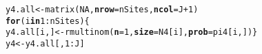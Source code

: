\documentclass[color=usenames,dvipsnames]{beamer}\usepackage[]{graphicx}\usepackage[]{color}
\makeatletter
\newcommand{\hlnum}[1]{\textcolor[rgb]{0.69,0.494,0}{#1}}%
\newcommand{\hlopt}[1]{\textcolor[rgb]{0,0,0}{#1}}%
\newcommand{\hlstd}[1]{\textcolor[rgb]{0,0,0}{#1}}%
\newcommand{\hlkwa}[1]{\textcolor[rgb]{0,0,0}{\textbf{#1}}}%
\newcommand{\hlkwb}[1]{\textcolor[rgb]{0,0.341,0.682}{#1}}%
\newcommand{\hlkwc}[1]{\textcolor[rgb]{0,0,0}{\textbf{#1}}}%
\newcommand{\hlkwd}[1]{\textcolor[rgb]{0.004,0.004,0.506}{#1}}%
\newenvironment{kframe}{%
 \def\at@end@of@kframe{}%
 \ifinner\ifhmode%
  \def\at@end@of@kframe{\end{minipage}}%
  \begin{minipage}{\columnwidth}%
 \fi\fi%
 \def\FrameCommand##1{\hskip\@totalleftmargin \hskip-\fboxsep
 \colorbox{shadecolor}{##1}\hskip-\fboxsep
     \hskip-\linewidth \hskip-\@totalleftmargin \hskip\columnwidth}%
 \MakeFramed {\advance\hsize-\width
   \@totalleftmargin\z@ \linewidth\hsize
   \@setminipage}}%
 {\par\unskip\endMakeFramed%
 \at@end@of@kframe}
\newenvironment{knitrout}{}{} %
\makeatother
\begin{document}
\begin{frame}[fragile]
  \vspace{-6pt}
\begin{knitrout}\scriptsize
{}\color{fgcolor}\begin{kframe}
\begin{alltt}
\hlstd{y4.all} \hlkwb{<-} \hlkwd{matrix}\hlstd{(}\hlnum{NA}\hlstd{,} \hlkwc{nrow}\hlstd{=nSites,} \hlkwc{ncol}\hlstd{=J}\hlopt{+}\hlnum{1}\hlstd{)}
\hlkwa{for}\hlstd{(i} \hlkwa{in} \hlnum{1}\hlopt{:}\hlstd{nSites) \{}
    \hlstd{y4.all[i,]} \hlkwb{<-} \hlkwd{rmultinom}\hlstd{(}\hlkwc{n}\hlstd{=}\hlnum{1}\hlstd{,} \hlkwc{size}\hlstd{=N4[i],} \hlkwc{prob}\hlstd{=pi4[i,])    \}}
\hlstd{y4} \hlkwb{<-} \hlstd{y4.all[,}\hlnum{1}\hlopt{:}\hlstd{J]}
\end{alltt}
\end{kframe}
\end{knitrout}
\end{frame}
\end{document}
